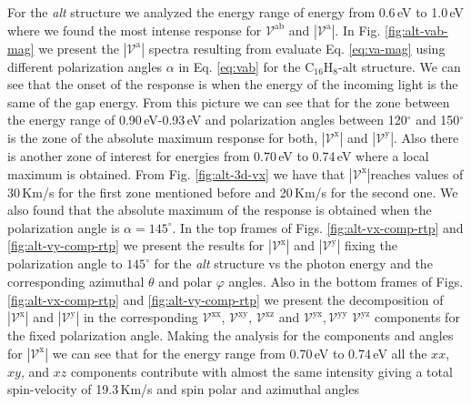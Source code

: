\documentclass[prb,11pt,tightenlines,twocolumn,aps]{revtex4-1}
\begin{document}
For the \emph{alt} structure we analyzed the energy range of energy from
0.6\,eV to 1.0\,eV where we found the most intense response for
$\mathcal{V}^{\mathrm{ab}}$ and $|\mathcal{V}^{\mathrm{a}}|$. In Fig. 
\ref{fig:alt-vab-mag} we present the $|\mathcal{V}^{\mathrm{a}}|$ spectra
resulting from evaluate Eq. \eqref{eq:va-mag} using different polarization
angles $\alpha$ in Eq. \eqref{eq:vab} for the C$_{16}$H$_{8}$-alt structure. We
can see that the onset of the response is when the energy of the incoming light
is the same of the gap energy.
%
From this picture we can see that for the zone between the energy range of
0.90\,eV-0.93\,eV and polarization angles between 120$^{\circ}$ and
150$^{\circ}$ is the zone of the absolute maximum response for both,
$|\mathcal{V}^{\mathrm{x}}|$ and $|\mathcal{V}^{\mathrm{y}}|$. Also there is
another zone of interest for energies from 0.70\,eV to 0.74\,eV where a local
maximum is obtained.
From Fig. \ref{fig:alt-3d-vx} we have that $|\mathcal{V}^{\mathrm{x}}|$reaches
values of 30\,Km/s for the first zone mentioned before and 20\,Km/s for
the second one. 
We also found that the absolute maximum of the response is obtained when the
polarization angle is $\alpha = 145^{\circ}$. 
%
In the top frames of Figs. \ref{fig:alt-vx-comp-rtp}  and 
\ref{fig:alt-vy-comp-rtp} we present the results for
$|\mathcal{V}^{\mathrm{x}}|$ and $|\mathcal{V}^{\mathrm{y}}|$ fixing the
polarization angle to $145^{\circ}$ for the \emph{alt} structure vs the photon
energy and the corresponding azimuthal $\theta$ and polar $\varphi$ angles.
%
Also in the bottom frames of Figs. \ref{fig:alt-vx-comp-rtp} and 
%
\ref{fig:alt-vy-comp-rtp} we present the decomposition of
$|\mathcal{V}^{\mathrm{x}}|$ and $|\mathcal{V}^{\mathrm{y}}|$ in the
corresponding $\mathcal{V}^{\mathrm{xx}}$, $\mathcal{V}^{\mathrm{xy}}$,
$\mathcal{V}^{\mathrm{xz}}$ and
$\mathcal{V}^{\mathrm{yx}},\mathcal{V}^{\mathrm{yy}}$
$\mathcal{V}^{\mathrm{yz}}$ components for the fixed polarization angle.
Making the analysis for the components and angles for
$|\mathcal{V}^{\mathrm{x}}|$ we can see that for the energy range from 0.70\,eV
to 0.74\,eV all the $xx$, $xy$, and $xz$ components contribute with almost the
same intensity giving a total spin-velocity of 19.3\,Km/s and spin polar and azimuthal angles
\end{document}
